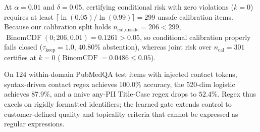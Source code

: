 \documentclass{article}
\begin{document}
\begin{table}[t]
\caption{Single-scorer LTT sweep ($n_{\text{cal}}=301$, $n_{\text{test}}=299$, $\delta=0.05$; $\tau_{\text{drop}}=0.25$ whenever $\tau_{\text{keep}} \ge 0.25$).}
\label{tab:ltt}
\vskip 0.08in
\begin{center}
\end{center}
\vskip -0.14in
\end{table}

At $\alpha=0.01$ and $\delta=0.05$, certifying conditional risk with zero violations ($k=0$) requires at least $\lceil \ln(0.05)/\ln(0.99) \rceil = 299$ unsafe calibration items. Because our calibration split holds $n_{\text{cal,unsafe}}=206 < 299$, $\operatorname{BinomCDF}(0; 206, 0.01) = 0.1261 > 0.05$, so conditional calibration properly fails closed ($\tau_{\text{keep}}=1.0$, $40.80\%$ abstention), whereas joint risk over $n_{\text{cal}}=301$ certifies at $k=0$ ($\operatorname{BinomCDF}=0.0486 \le 0.05$).

On $124$ within-domain PubMedQA test items with injected contact tokens, syntax-driven contact regex achieves $100.0\%$ accuracy, the 520-dim logistic achieves $87.9\%$, and a naive any-PII Title-Case regex drops to $52.4\%$. Regex thus excels on rigidly formatted identifiers; the learned gate extends control to customer-defined quality and topicality criteria that cannot be expressed as regular expressions.
\end{document}
